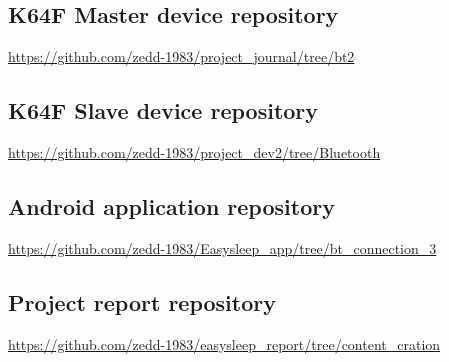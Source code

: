\documentclass[12pt,a4paper]{article}
\begin{document}
    \subsection*{K64F Master device repository}
    \url{https://github.com/zedd-1983/project_journal/tree/bt2}
    
    \subsection*{K64F Slave device repository}
    \url{https://github.com/zedd-1983/project_dev2/tree/Bluetooth}
    
    \subsection*{Android application repository}
    \url{https://github.com/zedd-1983/Easysleep_app/tree/bt_connection_3}
    
    \subsection*{Project report repository}
    \url{https://github.com/zedd-1983/easysleep_report/tree/content_cration}
    
    \newpage
    
\end{document}
